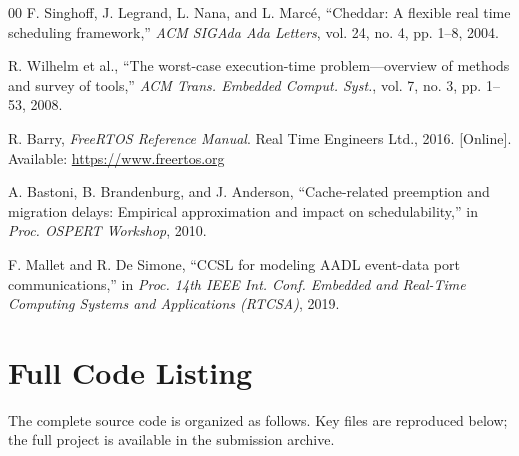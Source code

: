 \documentclass[conference]{IEEEtran}
\begin{document}
\begin{thebibliography}{00}
F. Singhoff, J. Legrand, L. Nana, and L. Marcé, ``Cheddar: A flexible real time scheduling framework,'' \textit{ACM SIGAda Ada Letters}, vol. 24, no. 4, pp. 1--8, 2004.

R. Wilhelm et al., ``The worst-case execution-time problem---overview of methods and survey of tools,'' \textit{ACM Trans. Embedded Comput. Syst.}, vol. 7, no. 3, pp. 1--53, 2008.

R. Barry, \textit{FreeRTOS Reference Manual}. Real Time Engineers Ltd., 2016. [Online]. Available: \url{https://www.freertos.org}

A. Bastoni, B. Brandenburg, and J. Anderson, ``Cache-related preemption and migration delays: Empirical approximation and impact on schedulability,'' in \textit{Proc. OSPERT Workshop}, 2010.

F. Mallet and R. De Simone, ``CCSL for modeling AADL event-data port communications,'' in \textit{Proc. 14th IEEE Int. Conf. Embedded and Real-Time Computing Systems and Applications (RTCSA)}, 2019.

\end{thebibliography}

\appendix
\section{Full Code Listing}

The complete source code is organized as follows. Key files are reproduced below; the full project is available in the submission archive.
\end{document}
